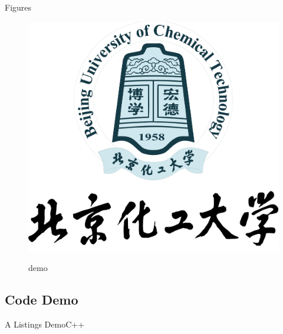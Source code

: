 \documentclass[
10pt,
aspectratio=169,
]{beamer}
\begin{document}
\begin{frame}{Figures}
\begin{figure}[h]
{    \includegraphics[scale=0.022]{logo.png}
    }
    \caption{demo}
\end{figure}
\end{frame}

\subsection{Code Demo}
\begin{frame}{A Listings Demo}{C++}
	\lstI
\end{frame}
\end{document}
